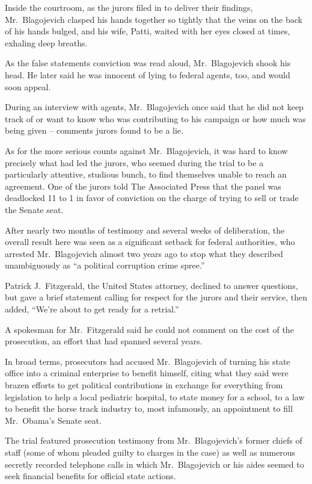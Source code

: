 ﻿\documentclass[12pt]{article}
\begin{document}
Inside the courtroom, as the jurors filed in to deliver their findings, Mr.~Blagojevich clasped his
hands together so tightly that the veins on the back of his hands bulged, and his wife, Patti,
waited with her eyes closed at times, exhaling deep breaths.

As the false statements conviction was read aloud, Mr.~Blagojevich shook his head. He later said he
was innocent of lying to federal agents, too, and would soon appeal.

During an interview with agents, Mr.~Blagojevich once said that he did not keep track of or want to
know who was contributing to his campaign or how much was being given -- comments jurors found to be
a lie.

As for the more serious counts against Mr.~Blagojevich, it was hard to know precisely what had led
the jurors, who seemed during the trial to be a particularly attentive, studious bunch, to find
themselves unable to reach an agreement. One of the jurors told The Associated Press that the panel
was deadlocked 11 to 1 in favor of conviction on the charge of trying to sell or trade the Senate
seat.

After nearly two months of testimony and several weeks of deliberation, the overall result here was
seen as a significant setback for federal authorities, who arrested Mr.~Blagojevich almost two years
ago to stop what they described unambiguously as ``a political corruption crime spree.''

Patrick J.~Fitzgerald, the United States attorney, declined to answer questions, but gave a brief
statement calling for respect for the jurors and their service, then added, ``We're about to get
ready for a retrial.''

A spokesman for Mr.~Fitzgerald said he could not comment on the cost of the prosecution, an effort
that had spanned several years.

In broad terms, prosecutors had accused Mr.~Blagojevich of turning his state office into a criminal
enterprise to benefit himself, citing what they said were brazen efforts to get political
contributions in exchange for everything from legislation to help a local pediatric hospital, to
state money for a school, to a law to benefit the horse track industry to, most infamously, an
appointment to fill Mr.~Obama's Senate seat.

The trial featured prosecution testimony from Mr.~Blagojevich's former chiefs of staff (some of whom
pleaded guilty to charges in the case) as well as numerous secretly recorded telephone calls in
which Mr.~Blagojevich or his aides seemed to seek financial benefits for official state actions.
\end{document}
